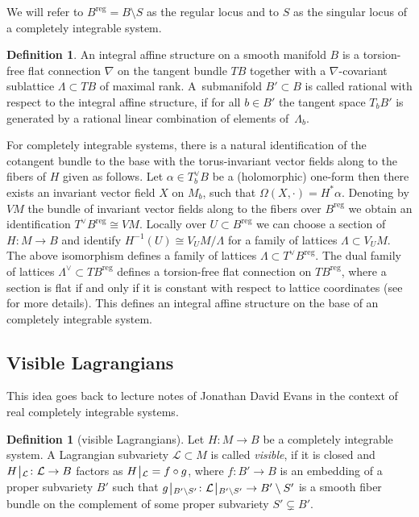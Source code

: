 \documentclass[10pt,a4paper]{amsart}
\numberwithin{equation}{section}
\theoremstyle{definition}
\newtheorem{defi}[theo]{Definition}
\newcommand{\reg}{\mathrm{reg}}
\newcommand{\rest}{\: \rule[-3.5pt]{0.5pt}{11.5pt}\,{}}
\renewcommand{\to}{\rightarrow}
\newcommand{\calL}{\mathcal{L}}
\begin{document}
We will refer to $B^\reg=B\setminus S$ as the regular locus and to $S$ as the singular locus of a completely integrable system.
\begin{defi} An integral affine structure on a smooth manifold $B$ is a torsion-free flat connection $\nabla$ on the tangent bundle $TB$ together with a $\nabla$-covariant sublattice $\Lambda \subset TB$ of maximal rank. A~submanifold $B' \subset B$ is called rational with respect to the integral affine structure, if for all $b \in B'$ the tangent space $T_bB'$ is generated by a rational linear combination of elements of~$\Lambda_b$.
\end{defi}
For completely integrable systems, there is a natural identification of the cotangent bundle to the base with the torus-invariant vector fields along to the fibers of $H$ given as follows. Let $\alpha \in T_b^\vee B$ be a (holomorphic) one-form then there exists an invariant vector field $X$ on $M_b$, such that $\Omega(X,\cdot)=H^*\alpha$. Denoting by $VM$ the bundle of invariant vector fields along to the fibers over $B^\reg$ we obtain an identification $T^\vee B^\reg \cong VM$. Locally over $U \subset B^\reg$ we can choose a section of $H\colon M \to B$ and identify $H^{-1}(U)\cong V_UM/\Lambda$ for a family of lattices $\Lambda \subset V_UM$. The above isomorphism defines a family of lattices $\Lambda \subset T^\vee B^\reg$. The dual family of lattices $\Lambda^\vee\subset TB^\reg$ defines a torsion-free flat connection on $T B^\reg$, where a section is flat if and only if it is constant with respect to lattice coordinates (see \cite[Section~3]{Freed} for more details). This defines an integral affine structure on the base of an completely integrable system.

\subsection{Visible Lagrangians}\label{sec:visible}
This idea goes back to lecture notes of Jonathan David Evans \cite[Chapter~5]{visible} in the context of real completely integrable systems.

\begin{defi}[visible Lagrangians]\label{def:visible-lagrangians}
Let $H\colon M \to B$ be a completely integrable system. A Lagrangian subvariety $\calL \subset M$ is called \textit{visible}, if it is closed and $H\rest_{\calL}\colon \calL \to B$ factors as $H\rest_{\calL}=f \circ g$, where $f\colon B' \to B$ is an embedding of a proper subvariety $B'$ such that $g\rest_{B'\setminus S'}\colon \calL\rest_{B'\setminus S'} \to B'\setminus S'$ is a smooth fiber bundle on the complement of some proper subvariety $S' \subsetneq B'$.
\end{defi}
\end{document}
